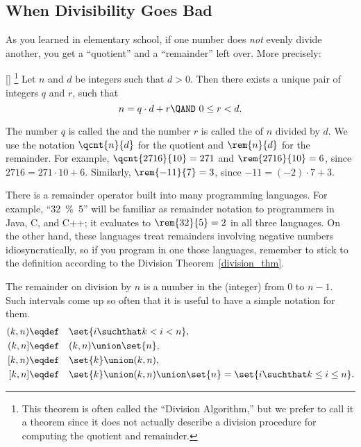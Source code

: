 \subsection{When Divisibility Goes Bad}

As you learned in elementary school, if one number does \emph{not}
evenly divide another, you get a ``quotient'' and a ``remainder'' left
over.  More precisely:
\begin{theorem}\label{division_thm}[]%
\footnote{This theorem is often called the ``Division Algorithm,'' but
  we prefer to call it a theorem since it does not actually describe
  a division procedure for computing the quotient and remainder.}  Let
$n$ and $d$ be integers such that $d > 0$.  Then there exists a unique
pair of integers $q$ and $r$, such that
\begin{equation}\label{nqdr}
n = q \cdot d + r \QAND\ 0 \leq r < d.
\end{equation}
\end{theorem}
The number $q$ is called the  and the number $r$ is
called the  of $n$ divided by $d$.  We use the
notation $\qcnt{n}{d}$ for the quotient and $\rem{n}{d}$ for the
remainder. For example, $\qcnt{2716}{10} = 271$ and $\rem{2716}{10} =
6$, since $2716 = 271 \cdot 10 + 6$.  Similarly, $\rem{-11}{7} = 3$,
since $-11 = (-2) \cdot 7 + 3$.

There is a remainder operator built into many programming languages.
For example, ``32~\%~5'' will be familiar as remainder notation to
programmers in Java, C, and C++; it evaluates to $\rem{32}{5} =2$ in
all three languages.  On the other hand, these languages treat
remainders involving negative numbers idiosyncratically, so if you
program in one those languages, remember to stick to the definition
according to the Division Theorem~\ref{division_thm}.

The remainder on division by $n$ is a number in the (integer)
 from 0 to $n-1$.  Such intervals come up so often that
it is useful to have a simple notation for them.
\begin{align*}
(k, n) & \eqdef\quad \set{i \suchthat k < i < n},\\
(k, n] & \eqdef\quad (k,n) \union \set{n},\\
[k, n) & \eqdef\quad \set{k} \union (k,n),\\
[k,n] & \eqdef\quad \set{k} \union (k,n) \union \set{n} = \set{i \suchthat k \leq i \leq n}.
\end{align*}

